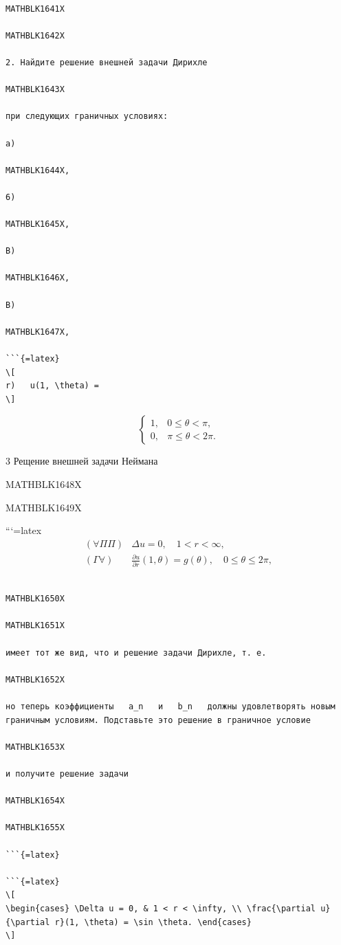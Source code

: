 \documentclass[
]{article}
\begin{document}
\begin{verbatim}

MATHBLK1641X

MATHBLK1642X

2. Найдите решение внешней задачи Дирихле

MATHBLK1643X

при следующих граничных условиях:

a)

MATHBLK1644X,

6)

MATHBLK1645X,

B)

MATHBLK1646X,

B)

MATHBLK1647X,

```{=latex}
\[
r)   u(1, \theta) =
\]
\end{verbatim}

\[
\begin{cases} 1, & 0 \le \theta < \pi, \\ 0, & \pi \le \theta < 2\pi. \end{cases}
\]

3 Рещение внешней задачи Неймана

MATHBLK1648X

MATHBLK1649X

```{=latex}
\[
\begin{aligned} (\forall \Pi \Pi) & \Delta u = 0, \quad 1 < r < \infty, \\ (\Gamma \forall) & \frac{\partial u}{\partial r} (1, \theta) = g(\theta), \quad 0 \leqslant \theta \leqslant 2\pi, \end{aligned}
\]

\begin{verbatim}

MATHBLK1650X

MATHBLK1651X

имеет тот же вид, что и решение задачи Дирихле, т. е.

MATHBLK1652X

но теперь коэффициенты   a_n   и   b_n   должны удовлетворять новым граничным условиям. Подставьте это решение в граничное условие

MATHBLK1653X

и получите решение задачи

MATHBLK1654X

MATHBLK1655X

```{=latex}

```{=latex}
\[
\begin{cases} \Delta u = 0, & 1 < r < \infty, \\ \frac{\partial u}{\partial r}(1, \theta) = \sin \theta. \end{cases}
\]
\end{verbatim}
\end{document}
